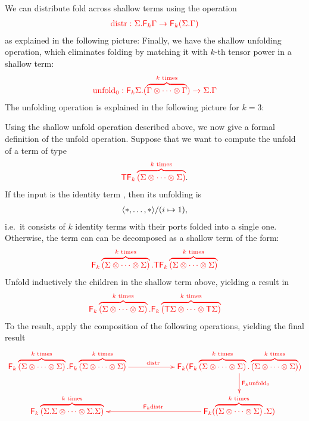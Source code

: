 We can distribute fold across shallow terms using the  operation
\begin{align*}
    {\color{red}{{\color{red}{\mathrm{distr}}}: {\color{red}{\Sigma . {\color{red}{\mathsf F_{k}}}\Gamma}} \to {\color{red}{\mathsf F_{k}}}({\color{red}{\Sigma . \Gamma}})}}
\end{align*}
as explained in the following picture:
Finally, we have the shallow unfolding operation, which eliminates folding   by matching it with $k$-th tensor power in a shallow term:
\begin{align*}
{\color{red}{
    {\color{red}{\mathrm{unfold}_0}}: {\color{red}{{\color{red}{\mathsf F_{k}}}\Sigma . (\overbrace{\Gamma \otimes \cdots \otimes \Gamma}^{\text{$k$ times}})}} \to {\color{red}{\Sigma . \Gamma}}
}}
\end{align*}
The unfolding operation is explained in the following picture for $k=3$:

\newcommand{\expmatrix}[1]{\reduce k \kpower{#1}}
\newcommand{\kpower}[1]{ \overbrace{(#1 \otimes \cdots \otimes #1)}^{\text{$k$ times}}}
 

Using the shallow unfold operation described above, we now give a formal definition of the unfold operation. Suppose that we want to compute the unfold of a term of type 
\begin{align*}
\ranked{\tmonad \expmatrix \Sigma}.
\end{align*}
If the input is the identity term ,  then its unfolding is 
\begin{align*}
    \langle{*,\ldots,*}\rangle/(i \mapsto 1),
\end{align*}
i.e.~it consists of $k$ identity terms with their ports folded into a single one.  Otherwise, the term can can be decomposed as a shallow term of the form: 
\begin{align*}
 \ranked{
    \shallowterm{ \expmatrix \Sigma} { \tmonad \expmatrix \Sigma}
}
\end{align*}
Unfold inductively  the children in the shallow term above, yielding a result in
\begin{align*}
   \ranked{
        \shallowterm{ \expmatrix \Sigma} {  \expmatrix {\tmonad \Sigma}}
    }
    \end{align*}
To the result, apply the composition of the following operations, yielding the final result
\begin{align*}
\ranked{
    \xymatrix@C=2cm{
        \shallowterm{\expmatrix \Sigma}{\expmatrix  \Sigma} \ar[r]^{\distrfold} &
        \reduce k (\shallowterm {\expmatrix \Sigma } {\kpower \Sigma}) \ar[d]^-{\reduce k \unfoldsmall}\\
        \reduce k \kpower{\shallowterm \Sigma \Sigma} &
        \reduce k (\shallowterm {\kpower \Sigma} \Sigma) \ar[l]_{\reduce k \distrtensor}
    }
}
\end{align*}

